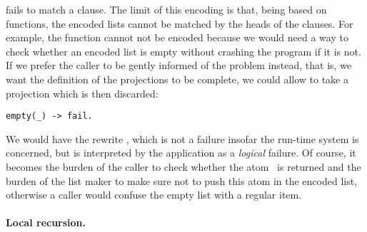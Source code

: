 fails to match a clause. The limit of this encoding is that, being
based on functions, the encoded lists cannot be matched by the heads
of the clauses. For example, the function 
  cannot not be encoded
because we would need a way to check whether an encoded list is empty
without crashing the program if it is not. If we prefer the caller to
be gently informed of the problem instead, that is, we want the
definition of the projections to be complete, we could allow
 to take a projection which is then discarded:
\begin{verbatim}
empty(_) -> fail.
\end{verbatim}
We would have the rewrite , which is not a failure insofar the run\hyp{}time system is
concerned, but is interpreted by the application as a \emph{logical}
failure. Of course, it becomes the burden of the caller to check
whether the atom~ is returned and the burden of the list
maker to make sure not to push this atom in the encoded list,
otherwise a caller would confuse the empty list with a regular item.

\medskip

\paragraph{Local recursion.}

